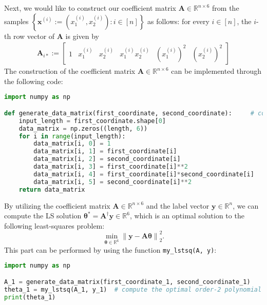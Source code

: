 \documentclass[11pt]{article}
\begin{document}
\indent Next, we would like to construct our coefficient matrix $\mathbf{A} \in \mathbb{R}^{n \times 6}$ from the samples $\left\{ \mathbf{x}^{(i)} := \left( x_{1}^{(i)}, x_{2}^{(i)} \right) : i \in [n] \right\}$ as follows: for every $i \in [n]$, the $i$-th row vector of $\mathbf{A}$ is given by
\begin{equation*}
    \begin{split}
        \mathbf{A}_{i*} := 
        \begin{bmatrix}
            1 & x_{1}^{(i)} & x_{2}^{(i)} & x_{1}^{(i)} x_{2}^{(i)} & \left( x_{1}^{(i)} \right)^2 & \left( x_{2}^{(i)} \right)^2
        \end{bmatrix}
    \end{split}
\end{equation*}
The construction of the coefficient matrix $\mathbf{A} \in \mathbb{R}^{n \times 6}$ can be implemented through the following code:
\begin{lstlisting}[language = Python]
import numpy as np

def generate_data_matrix(first_coordinate, second_coordinate):     # construct a proper data matrix (2-dimensional array) of shape length \times 6
    input_length = first_coordinate.shape[0]
    data_matrix = np.zeros((length, 6))
    for i in range(input_length):
        data_matrix[i, 0] = 1
        data_matrix[i, 1] = first_coordinate[i]
        data_matrix[i, 2] = second_coordinate[i]
        data_matrix[i, 3] = first_coordinate[i]**2
        data_matrix[i, 4] = first_coordinate[i]*second_coordinate[i]
        data_matrix[i, 5] = second_coordinate[i]**2
    return data_matrix
\end{lstlisting}

\noindent By utilizing the coefficient matrix $\mathbf{A} \in \mathbb{R}^{n \times 6}$ and the label vector $\mathbf{y} \in \mathbb{R}^n$, we can compute the LS solution $\bm{\theta}^* = \mathbf{A}^{\dagger} \mathbf{y} \in \mathbb{R}^6$, which is an optimal solution to the following least-squares problem:
\begin{equation}
    \label{eqn2}
    \min_{\bm{\theta} \in \mathbb{R}^6} \left\| \mathbf{y} - \mathbf{A} \bm{\theta} \right\|_{2}^2.
\end{equation}
This part can be performed by using the function \texttt{my\_lstsq(A, y)}:
\begin{lstlisting}[language = Python]
import numpy as np

A_1 = generate_data_matrix(first_coordinate_1, second_coordinate_1)
theta_1 = my_lstsq(A_1, y_1)  # compute the optimal order-2 polynomial that minimizes (3)
print(theta_1)
\end{lstlisting}
\end{document}
